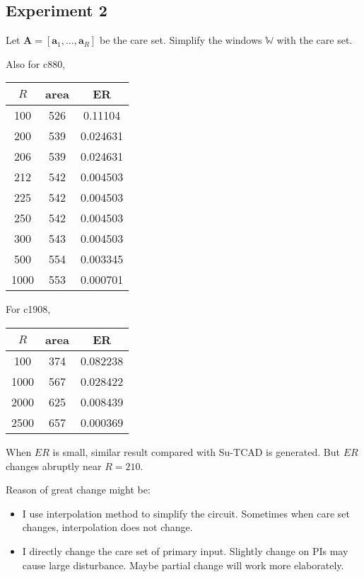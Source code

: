 \documentclass{rpt}
\begin{document}
\subsection{Experiment 2}
Let $\mathbf{A} = [\mathbf{a}_1, \ldots, \mathbf{a}_R]$ be the care set.
Simplify the windows $\mathbb{W}$ with the care set.

Also for c880,

\begin{tabular}{ccc}
    \hline
    $R$ & area & ER \\
    \hline
    100 & 526 & 0.11104 \\
    \hline
    200 & 539 & 0.024631 \\
    \hline
    206 & 539 & 0.024631 \\
    \hline
    212 & 542 & 0.004503 \\
    \hline
    225 & 542 & 0.004503 \\
    \hline
    250 & 542 & 0.004503 \\
    \hline
    300 & 543 & 0.004503 \\
    \hline
    500 & 554 & 0.003345 \\
    \hline
    1000 & 553 & 0.000701 \\
    \hline
\end{tabular}

For c1908,

\begin{tabular}{ccc}
    \hline
    $R$ & area & ER \\
    \hline
    100 & 374 &  0.082238 \\
    \hline
    1000 & 567 & 0.028422 \\
    \hline
    2000 & 625 & 0.008439 \\ 
    \hline
    2500 & 657 & 0.000369 \\
\end{tabular}

When $ER$ is small, similar result compared with Su-TCAD is generated.
But $ER$ changes abruptly near $R=210$.

Reason of great change might be:
\begin{itemize}
    \item
        I use interpolation method to simplify the circuit.
        Sometimes when care set changes,
        interpolation does not change.
    \item
        I directly change the care set of primary input.
        Slightly change on PIs may cause large disturbance.
        Maybe partial change will work more elaborately.
\end{itemize}
\end{document}
